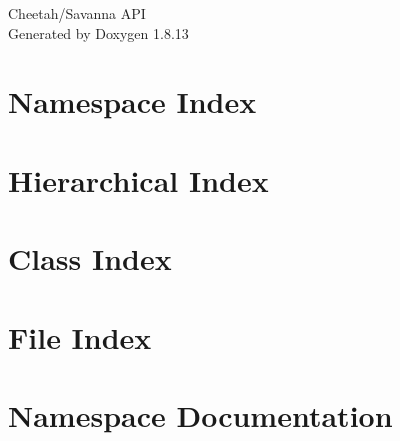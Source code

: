 \documentclass[twoside]{book}
\newcommand{\+}{\discretionary{\mbox{\scriptsize$\hookleftarrow$}}{}{}}
\newcommand{\clearemptydoublepage}{%
  \newpage{\pagestyle{empty}\cleardoublepage}%
}
\begin{document}
\hypersetup{pageanchor=false,
             bookmarksnumbered=true,
             pdfencoding=unicode
            }
\begin{titlepage}
\vspace*{7cm}
\begin{center}%
{\Large Cheetah/\+Savanna A\+PI }\\
\vspace*{1cm}
{\large Generated by Doxygen 1.8.13}\\
\end{center}
\end{titlepage}
\clearemptydoublepage
{}
\tableofcontents
\clearemptydoublepage
{}
\hypersetup{pageanchor=true}

\chapter{Namespace Index}

\chapter{Hierarchical Index}

\chapter{Class Index}

\chapter{File Index}

\chapter{Namespace Documentation}





























\end{document}
